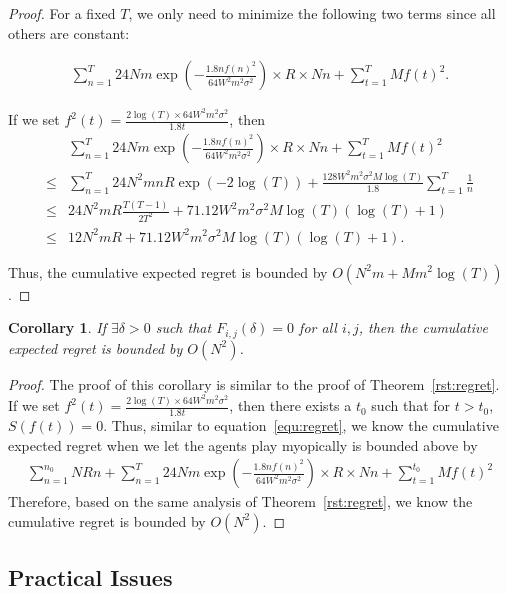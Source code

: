 \documentclass[twoside,11pt]{article}
\newtheorem{corollary}{Corollary}
\begin{document}
\begin{proof}
For a fixed $T$, we only need to minimize the following two terms since all others are constant:

\begin{align}
\sum_{n=1}^{T} 24Nm\exp\left(-\frac{1.8n f(n)^2}{64 W^2 m^2\sigma^2}\right)\times R \times Nn+ \sum_{t=1}^{T}Mf(t)^2. \label{equ:regret}
\end{align}


If we set $f^2(t)=\frac{2\log(T)\times 64W^2 m^2\sigma^2}{1.8t}$, then
\begin{align}
&\sum_{n=1}^{T} 24Nm\exp\left(-\frac{1.8n f(n)^2}{64 W^2 m^2\sigma^2}\right)\times R \times Nn+ \sum_{t=1}^{T}Mf(t)^2 \nonumber \\ 
\leq & \sum_{n=1}^{T} 24N^2 mnR \exp\left(-2\log(T)\right)  + \frac{128W^2 m^2\sigma^2 M\log(T)}{1.8}\sum_{t=1}^{T}\frac{1}{n} \nonumber \\
\leq &  24N^2 m R\frac{T(T-1)}{2T^2}  + 71.12 W^2 m^2\sigma^2 M\log(T)(\log(T)+1) \nonumber \\
\leq &  12 N^2 m R  + 71.12 W^2 m^2\sigma^2 M\log(T)(\log(T)+1). \nonumber
\end{align}

Thus, the cumulative expected regret is bounded by $O(N^2 m + M m^2\log(T))$.
\end{proof}

\begin{corollary}
If $\exists \delta>0$ such that $F_{i,j}(\delta)=0$ for all $i,j$, then the cumulative expected regret is bounded by $O(N^2)$.
\end{corollary}


\begin{proof}
The proof of this corollary is similar to the proof of Theorem~\ref{rst:regret}. If we set $f^2(t)=\frac{2\log(T)\times 64W^2 m^2\sigma^2}{1.8t}$, then there exists a $t_{0}$ such that for $t>t_{0}$, $S(f(t))=0$. Thus, similar to equation~\eqref{equ:regret}, we know the cumulative expected regret when we let the agents play myopically is bounded above by
\begin{align}
\sum_{n=1}^{n_{0}}NRn + \sum_{n=1}^{T} 24Nm\exp\left(-\frac{1.8n f(n)^2}{64 W^2 m^2\sigma^2}\right)\times R \times Nn+ \sum_{t=1}^{t_{0}}Mf(t)^2 \nonumber
\end{align}
Therefore, based on the same analysis of Theorem~\ref{rst:regret}, we know the cumulative regret is bounded by $O(N^2)$.
\end{proof}


\subsection{Practical Issues}
\label{sec:pi}
\end{document}
